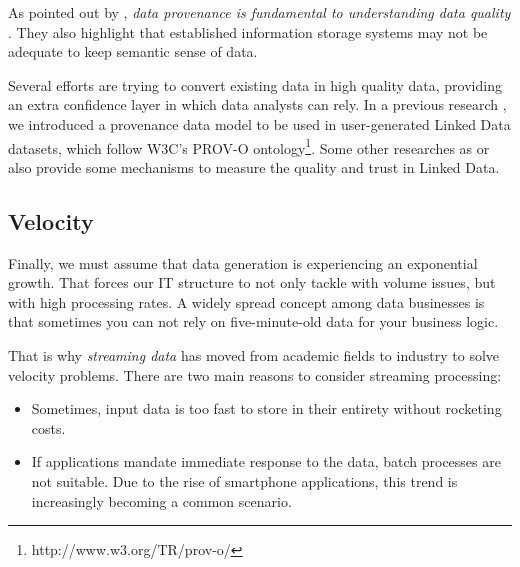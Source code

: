 As pointed out by \cite{buneman2013data}, \textit{data provenance is fundamental to understanding data quality} . They also highlight that established information storage systems may not be adequate to keep semantic sense of data.

Several efforts are trying to convert existing data in high quality data, providing an extra confidence layer in which data analysts can rely. In a previous research \cite{emalditrust}, we introduced a provenance data model to be used in user-generated Linked Data datasets, which follow W3C's PROV-O ontology\footnote{http://www.w3.org/TR/prov-o/}. Some other researches as \cite{hartig_using_2009} or \cite{bizer_quality_2009} also provide some mechanisms to measure the quality and trust in Linked Data. 

\subsection{Velocity}

Finally, we must assume that data generation is experiencing an exponential growth. That forces our IT structure to not only tackle with volume issues, but with high processing rates. A widely spread concept among data businesses is that sometimes you can not rely on five-minute-old data for your business logic.

That is why \textit{streaming data} has moved from academic fields to industry to solve velocity problems. There are two main reasons to consider streaming processing:
\begin{itemize}
	\item Sometimes, input data is too fast to store in their entirety without rocketing costs.
	\item If applications mandate immediate response to the data, batch processes are not suitable. Due to the rise of smartphone applications, this trend is increasingly becoming a common scenario.
\end{itemize}
